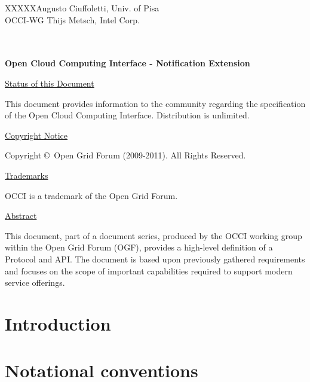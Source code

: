 \documentclass[10pt,a4paper]{article}
\newcommand{\doccode}{XXXXX}
\begin{document}
\thispagestyle{empty}

\doccode \hfill Augusto Ciuffoletti, Univ. of Pisa\\ 
OCCI-WG \hfill Thijs Metsch, Intel Corp.\\
\\
\\

\vspace*{0.5in}

\begin{Large}
\textbf{Open Cloud Computing Interface - Notification Extension}
\end{Large}

\vspace*{0.5in}

\underline{Status of this Document}

This document provides information to the community regarding the
specification of the Open Cloud Computing Interface. Distribution is
unlimited.

\underline{Copyright Notice}

Copyright \copyright ~Open Grid Forum (2009-2011). All Rights Reserved.

\underline{Trademarks}

OCCI is a trademark of the Open Grid Forum.

\underline{Abstract}

This document, part of a document series, produced by the OCCI working
group within the Open Grid Forum (OGF), provides a high-level
definition of a Protocol and API. The document is based upon
previously gathered requirements and focuses on the scope of important
capabilities required to support modern service offerings.


\newpage
\tableofcontents
\newpage

\section{Introduction}


\section{Notational conventions}


\newcommand{\smx}{{\em notifier}}
\newcommand{\ntfl}{{\em notification}}
\end{document}

